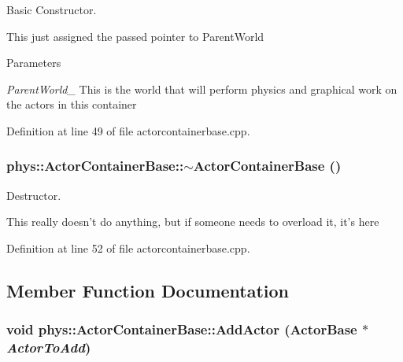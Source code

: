 Basic Constructor. 

This just assigned the passed pointer to ParentWorld 
\begin{DoxyParams}{Parameters}
\item[{\em ParentWorld\_\-}]This is the world that will perform physics and graphical work on the actors in this container \end{DoxyParams}


Definition at line 49 of file actorcontainerbase.cpp.

\hypertarget{classphys_1_1ActorContainerBase_aa5eac062dd70a220a4ec6df973c6f258}{
\subsubsection[{$\sim$ActorContainerBase}]{\setlength{\rightskip}{0pt plus 5cm}phys::ActorContainerBase::$\sim$ActorContainerBase ()}}
\label{d1/d00/classphys_1_1ActorContainerBase_aa5eac062dd70a220a4ec6df973c6f258}


Destructor. 

This really doesn't do anything, but if someone needs to overload it, it's here 

Definition at line 52 of file actorcontainerbase.cpp.



\subsection{Member Function Documentation}
\hypertarget{classphys_1_1ActorContainerBase_af32c2adf4c0f928604ce05e20b07ef66}{
\subsubsection[{AddActor}]{\setlength{\rightskip}{0pt plus 5cm}void phys::ActorContainerBase::AddActor ({\bf ActorBase} $\ast$ {\em ActorToAdd})}}
\label{d1/d00/classphys_1_1ActorContainerBase_af32c2adf4c0f928604ce05e20b07ef66}


